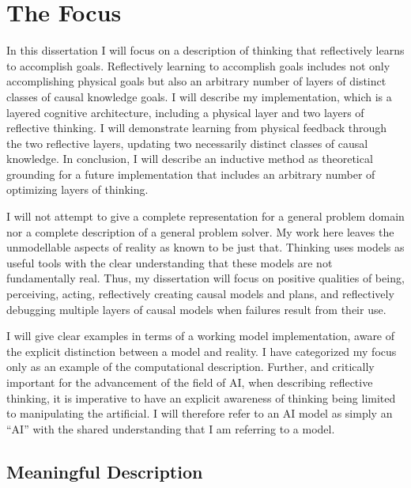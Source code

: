 \chapter{The Focus}
\label{chapter:the_focus}

In this dissertation I will focus on a description of thinking that
reflectively learns to accomplish goals.  Reflectively learning to
accomplish goals includes not only accomplishing physical goals but
also an arbitrary number of layers of distinct classes of causal
knowledge goals.  I will describe my implementation, which is a
layered cognitive architecture, including a physical layer and two
layers of reflective thinking.  I will demonstrate learning from
physical feedback through the two reflective layers, updating two
necessarily distinct classes of causal knowledge.  In conclusion, I
will describe an inductive method as theoretical grounding for a
future implementation that includes an arbitrary number of optimizing
layers of thinking.

I will not attempt to give a complete representation for a general
problem domain nor a complete description of a general problem solver.
My work here leaves the unmodellable aspects of reality as known to be
just that.  Thinking uses models as useful tools with the clear
understanding that these models are not fundamentally real.  Thus, my
dissertation will focus on positive qualities of being, perceiving,
acting, reflectively creating causal models and plans, and
reflectively debugging multiple layers of causal models when failures
result from their use.

I will give clear examples in terms of a working model implementation,
aware of the explicit distinction between a model and reality.  I have
categorized my focus only as an example of the computational
description.  Further, and critically important for the advancement of
the field of AI, when describing reflective thinking, it is imperative
to have an explicit awareness of thinking being limited to
manipulating the artificial.  I will therefore refer to an AI model as
simply an ``AI'' with the shared understanding that I am referring to
a model.

\section{Meaningful Description}

